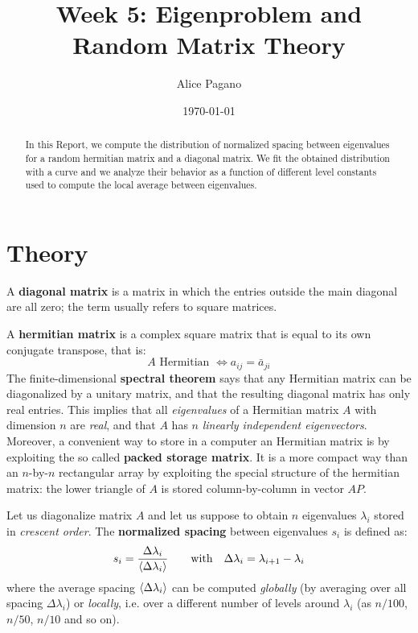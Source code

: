 \documentclass[rmp,10pt,onecolumn,fleqn,notitlepage]{revtex4-1}
\begin{document}
\title{Week 5: Eigenproblem and Random Matrix Theory}
\author{Alice Pagano}
\date{\today}

\begin{abstract}
In this Report, we compute the distribution of normalized spacing between eigenvalues for a random hermitian matrix and a diagonal matrix. We fit the obtained distribution with a curve and we analyze their behavior as a function of different level constants used to compute the local average between eigenvalues.
\end{abstract}

\maketitle


\section{Theory}
A \textbf{diagonal matrix} is a matrix in which the entries outside the main diagonal are all zero;  the term usually refers to square matrices.

A \textbf{hermitian matrix} is a complex square matrix that is equal to its own conjugate transpose, that is:
\begin{equation}
  A \text{ Hermitian } \iff a_{ij} = \bar{a}_{ji}
\end{equation}
The finite-dimensional \textbf{spectral theorem} says that any Hermitian matrix can be diagonalized by a unitary matrix, and that the resulting diagonal matrix has only real entries. This implies that all \emph{eigenvalues} of a Hermitian matrix $A$ with dimension $n$ are \emph{real}, and that $A$ has $n$ \emph{linearly independent eigenvectors}.
Moreover, a convenient way to store in a computer an Hermitian matrix is by exploiting the so called \textbf{packed storage matrix}. It is a more compact way than an $n$-by-$n$ rectangular array by exploiting the special structure of the hermitian matrix: the lower triangle of $A$ is stored column-by-column in vector $AP$.


Let us diagonalize matrix $A$ and let us suppose to obtain $n$ eigenvalues \( \lambda _i \) stored in \emph{crescent order}. The \textbf{normalized spacing} between eigenvalues \( s_i \) is defined as:
\begin{equation}
    s_i = \frac{\Delta \lambda _i }{ \expval{\Delta \lambda _i} } \qquad \text{with}  \quad
  \Delta \lambda _i = \lambda _{i+1} - \lambda _i
  \label{eq:si}
\end{equation}
where the average spacing $\expval{\Delta \lambda _i}$ can be computed \emph{globally} (by averaging over all spacing \( \Delta \lambda _i \)) or \emph{locally}, i.e. over a different number of levels around \( \lambda _i \) (as \( n/100 \), \( n/50 \), \( n/10 \) and so on).
\end{document}

